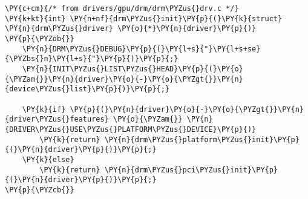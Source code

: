 \begin{Verbatim}[commandchars=\\\{\}]
\PY{c+cm}{/* from drivers/gpu/drm/drm\PYZus{}drv.c */}
\PY{k+kt}{int} \PY{n+nf}{drm\PYZus{}init}\PY{p}{(}\PY{k}{struct} \PY{n}{drm\PYZus{}driver} \PY{o}{*}\PY{n}{driver}\PY{p}{)}
\PY{p}{\PYZob{}}
	\PY{n}{DRM\PYZus{}DEBUG}\PY{p}{(}\PY{l+s}{"}\PY{l+s+se}{\PYZbs{}n}\PY{l+s}{"}\PY{p}{)}\PY{p}{;}
	\PY{n}{INIT\PYZus{}LIST\PYZus{}HEAD}\PY{p}{(}\PY{o}{\PYZam{}}\PY{n}{driver}\PY{o}{-}\PY{o}{\PYZgt{}}\PY{n}{device\PYZus{}list}\PY{p}{)}\PY{p}{;}

	\PY{k}{if} \PY{p}{(}\PY{n}{driver}\PY{o}{-}\PY{o}{\PYZgt{}}\PY{n}{driver\PYZus{}features} \PY{o}{\PYZam{}} \PY{n}{DRIVER\PYZus{}USE\PYZus{}PLATFORM\PYZus{}DEVICE}\PY{p}{)}
		\PY{k}{return} \PY{n}{drm\PYZus{}platform\PYZus{}init}\PY{p}{(}\PY{n}{driver}\PY{p}{)}\PY{p}{;}
	\PY{k}{else}
		\PY{k}{return} \PY{n}{drm\PYZus{}pci\PYZus{}init}\PY{p}{(}\PY{n}{driver}\PY{p}{)}\PY{p}{;}
\PY{p}{\PYZcb{}}
\end{Verbatim}
